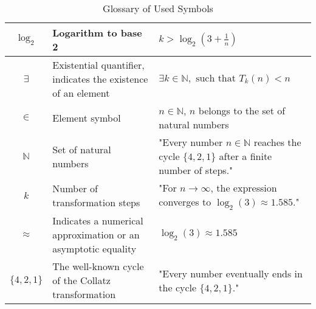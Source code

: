 \documentclass[a4paper,12pt]{article}
\begin{document}
\begin{table}[h!]
\begin{tabular}{|c|p{7cm}|p{5cm}|}
    \( \log_2 \) & Logarithm to base 2 & \( k > \log_2(3 + \frac{1}{n}) \) \\ \hline
    \( \exists \) & Existential quantifier, indicates the existence of an element & \( \exists k \in \mathbb{N}, \text{ such that } T_k(n) < n \) \\ \hline
    \( \in \) & Element symbol & \( n \in \mathbb{N} \), \( n \) belongs to the set of natural numbers \\ \hline
    \( \mathbb{N} \) & Set of natural numbers & "Every number \( n \in \mathbb{N} \) reaches the cycle \( \{4, 2, 1\} \) after a finite number of steps." \\ \hline
    \( k \) & Number of transformation steps & "For \( n \to \infty \), the expression converges to \( \log_2(3) \approx 1.585 \)." \\ \hline
    \( \approx \) & Indicates a numerical approximation or an asymptotic equality & \( \log_2(3) \approx 1.585 \) \\ \hline
    \( \{4, 2, 1\} \) & The well-known cycle of the Collatz transformation & "Every number eventually ends in the cycle \( \{4, 2, 1\} \)." \\ \hline
    \end{tabular}
    \caption{Glossary of Used Symbols}
    \label{tab:glossary}
\end{table}
\end{document}

